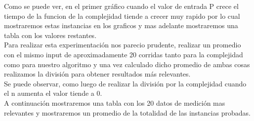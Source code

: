 Como se puede ver, en el primer gr\'afico cuando el valor de entrada P crece el tiempo de la funcion de la complejidad tiende a crecer muy rapido por lo cual mostraremos estas instancias en los graficos y mas adelante mostraremos una tabla con los valores restantes.\\

Para realizar esta experimentaci\'on nos parecio prudente, realizar un promedio con el mismo input de aproximadamente 20 corridas
tanto para la complejidad como para nuestro algoritmo y una vez calculado dicho promedio de ambas cosas realizamos la divisi\'on para
obtener resultados m\'as relevantes.\\ 

Se puede observar, como luego de realizar la divisi\'on por la complejidad cuando el n aumenta el valor tiende a 0.\\

A continuaci\'on mostraremos una tabla  con los 20 datos de medici\'on mas relevantes  y mostraremos un promedio de la totalidad de las instancias probadas.\\

